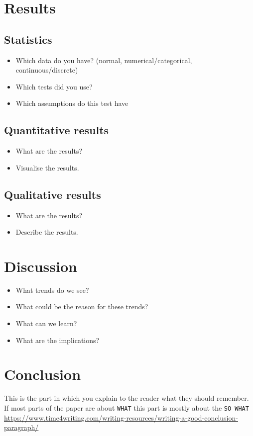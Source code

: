 \documentclass[sigconf,nonacm]{acmart}
\begin{document}
\section{Results}
\subsection{Statistics}
\begin{itemize}
    \item Which data do you have? (normal, numerical/categorical, continuous/discrete)
    \item Which tests did you use?
    \item Which assumptions do this test have 
\end{itemize}
\subsection{Quantitative results}
\begin{itemize}
    \item What are the results?
    \item Visualise the results.
\end{itemize}

\subsection{Qualitative results}
\begin{itemize}
    \item What are the results?
    \item Describe the results.
\end{itemize}

\section{Discussion}
\begin{itemize}
    \item What trends do we see?
    \item What could be the reason for these trends?
    \item What can we learn?
    \item What are the implications?
\end{itemize}

\section{Conclusion}
This is the part in which you explain to the reader what they should remember.
If most parts of the paper are about \texttt{WHAT} this part is mostly about the \texttt{SO WHAT}
\url{https://www.time4writing.com/writing-resources/writing-a-good-conclusion-paragraph/}
\end{document}

